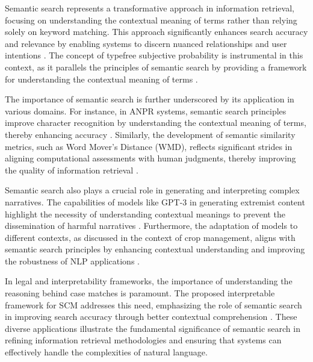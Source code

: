 Semantic search represents a transformative approach in information retrieval, focusing on understanding the contextual meaning of terms rather than relying solely on keyword matching. This approach significantly enhances search accuracy and relevance by enabling systems to discern nuanced relationships and user intentions . The concept of typefree subjective probability is instrumental in this context, as it parallels the principles of semantic search by providing a framework for understanding the contextual meaning of terms \cite{cieslinski2022axiomstypefreesubjectiveprobability}. 



The importance of semantic search is further underscored by its application in various domains. For instance, in ANPR systems, semantic search principles improve character recognition by understanding the contextual meaning of terms, thereby enhancing accuracy \cite{adak2022automaticnumberplaterecognition}. Similarly, the development of semantic similarity metrics, such as Word Mover's Distance (WMD), reflects significant strides in aligning computational assessments with human judgments, thereby improving the quality of information retrieval \cite{yamshchikov2020styletransferparaphraselookingsensible}.



Semantic search also plays a crucial role in generating and interpreting complex narratives. The capabilities of models like GPT-3 in generating extremist content highlight the necessity of understanding contextual meanings to prevent the dissemination of harmful narratives \cite{mcguffie2020radicalizationrisksgpt3advanced}. Furthermore, the adaptation of models to different contexts, as discussed in the context of crop management, aligns with semantic search principles by enhancing contextual understanding and improving the robustness of NLP applications \cite{kaur2024cropcontextwiserobuststatic}.



In legal and interpretability frameworks, the importance of understanding the reasoning behind case matches is paramount. The proposed interpretable framework for SCM addresses this need, emphasizing the role of semantic search in improving search accuracy through better contextual comprehension \cite{lin2023interpretabilityframeworksimilarcase}. These diverse applications illustrate the fundamental significance of semantic search in refining information retrieval methodologies and ensuring that systems can effectively handle the complexities of natural language.





